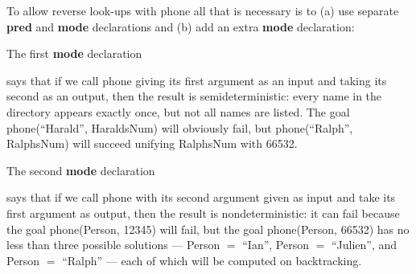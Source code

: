 \documentclass[a4paper,11pt,notitlepage,onecolumn]{book}
\begin{document}
To allow reverse look-ups with \textsf{phone} all that is necessary is to (a) use
separate \textsf{\textbf{pred}} and \textsf{\textbf{mode}} declarations and (b) add an extra \textsf{\textbf{mode}}
declaration:
\begin{small}

\begin{ptabular}
\nextline
{}
\nextline
{}
\nextline
\end{ptabular}

\end{small}

The first \textsf{\textbf{mode}} declaration
\begin{small}

\begin{ptabular}
\nextline
\end{ptabular}

\end{small}
says that if we call \textsf{phone} giving its first argument as an input and
taking its second as an output, then the result is semideterministic: every
name in the directory appears exactly once, but not all names are
listed.  The goal \textsf{phone(``Harald'', HaraldsNum)} will obviously fail, but
\textsf{phone(``Ralph'', RalphsNum)} will succeed unifying \textsf{RalphsNum} with \textsf{66532}.

The second \textsf{\textbf{mode}} declaration
\begin{small}

\begin{ptabular}
\nextline
\end{ptabular}

\end{small}
says that if we call \textsf{phone} with its second
argument given as input and take its first argument as output, then the
result is nondeterministic: it can fail because the goal
\textsf{phone(Person, 12345)} will fail, but the goal \textsf{phone(Person, 66532)}
has no less than three possible solutions --- \textsf{Person {\ensuremath{=}} ``Ian''},
\textsf{Person {\ensuremath{=}} ``Julien''}, and \textsf{Person {\ensuremath{=}} ``Ralph''} --- each of which will be
computed on backtracking.
\end{document}
